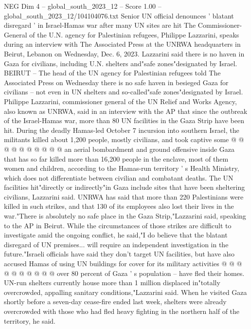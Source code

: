 \begin{textsample}{NEG Dim 4 – global\_south\_2023\_12 – Score 1.00 – global\_south\_2023\_12/104104076.txt}  \label{ex:f4_neg_318}
Senior UN official denounces ' blatant disregard ' in Israel-Hamas war after many UN sites are hit The Commissioner-General of the U.N. agency for Palestinian refugees, Philippe Lazzarini, speaks during an interview with The Associated Press at the UNRWA headquarters in Beirut, Lebanon on Wednesday, Dec. 6, 2023.
Lazzarini said there is no haven in Gaza for civilians, including U.N. shelters and"safe zones"designated by Israel.
BEIRUT -- The head of the UN agency for Palestinian refugees told The Associated Press on Wednesday there is no safe haven in besieged Gaza for civilians -- not even in UN shelters and so-called"safe zones"designated by Israel.
Philippe Lazzarini, commissioner general of the UN Relief and Works Agency, also known as UNRWA, said in an interview with the AP that since the outbreak of the Israel-Hamas war, more than 80 UN facilities in the Gaza Strip have been hit.
During the deadly Hamas-led October 7 incursion into southern Israel, the militants killed about 1,200 people, mostly civilians, and took captive some @ @ @ @ @ @ @ @ @ @ an aerial bombardment and ground offensive inside Gaza that has so far killed more than 16,200 people in the enclave, most of them women and children, according to the Hamas-run territory ' s Health Ministry, which does not differentiate between civilian and combatant deaths.
The UN facilities hit"directly or indirectly"in Gaza include sites that have been sheltering civilians, Lazzarini said.
UNRWA has said that more than 220 Palestinians were killed in such strikes, and that 130 of its employees also lost their lives in the war."There is absolutely no safe place in the Gaza Strip,"Lazzarini said, speaking to the AP in Beirut.
While the circumstances of those strikes are difficult to investigate amid the ongoing conflict, he said,"I do believe that the blatant disregard of UN premises... will require an independent investigation in the future."Israeli officials have said they don't target UN facilities, but have also accused Hamas of using UN buildings for cover for its military activities @ @ @ @ @ @ @ @ @ @ over 80 percent of Gaza ' s population -- have fled their homes.
UN-run shelters currently house more than 1 million displaced in"totally overcrowded, appalling sanitary conditions,"Lazzarini said.
When he visited Gaza shortly before a seven-day cease-fire ended last week, shelters were already overcrowded with those who had fled heavy fighting in the northern half of the territory, he said.

\end{textsample}
